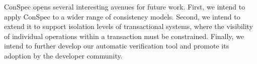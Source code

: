 \documentclass[journal,compsoc]{IEEEtran}
\begin{document}
ConSpec opens several interesting avenues for future work. First, we intend to apply ConSpec to a wider range of consistency models. Second, we intend to extend it to support isolation levels of transactional systems, where the visibility of individual operations within a transaction must be constrained. Finally, we intend to further develop our automatic verification tool and promote its adoption by the developer community.





%
\end{document}
